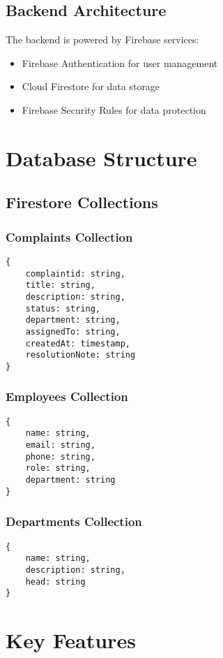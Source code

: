 \documentclass[12pt,a4paper]{article}
\begin{document}
\subsection{Backend Architecture}
The backend is powered by Firebase services:
\begin{itemize}
    \item Firebase Authentication for user management
    \item Cloud Firestore for data storage
    \item Firebase Security Rules for data protection
\end{itemize}

\section{Database Structure}
\subsection{Firestore Collections}
\subsubsection{Complaints Collection}
\begin{lstlisting}
{
    complaintid: string,
    title: string,
    description: string,
    status: string,
    department: string,
    assignedTo: string,
    createdAt: timestamp,
    resolutionNote: string
}
\end{lstlisting}

\subsubsection{Employees Collection}
\begin{lstlisting}
{
    name: string,
    email: string,
    phone: string,
    role: string,
    department: string
}
\end{lstlisting}

\subsubsection{Departments Collection}
\begin{lstlisting}
{
    name: string,
    description: string,
    head: string
}
\end{lstlisting}

\section{Key Features}
\end{document}
